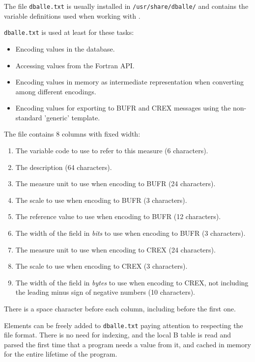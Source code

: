 The file {\tt dballe.txt} is usually installed in {\tt /usr/share/dballe/} and
contains the variable definitions used when working with \dballe{}.

{\tt dballe.txt} is used at least for these tasks:

\begin{itemize}
\item Encoding values in the \dballe{} database.
\item Accessing values from the Fortran API\cite{FAPI}.
\item Encoding values in memory as intermediate representation when converting
      among different encodings.
\item Encoding values for exporting to BUFR and CREX messages using the
      non-standard 'generic' template.
\end{itemize}

The file contains 8 columns with fixed width:

\begin{enumerate}
\item The variable code to use to refer to this measure (6 characters).
\item The description (64 characters).
\item The measure unit to use when encoding to BUFR (24 characters).
\item The scale to use when encoding to BUFR (3 characters).
\item The reference value to use when encoding to BUFR (12 characters).
\item The width of the field in \emph{bits} to use when encoding to BUFR (3 characters).
\item The measure unit to use when encoding to CREX (24 characters).
\item The scale to use when encoding to CREX (3 characters).
\item The width of the field in \emph{bytes} to use when encoding to CREX, not
      including the leading minus sign of negative numbers (10 characters).
\end{enumerate}

There is a space character before each column, including before the first one.

Elements can be freely added to {\tt dballe.txt} paying attention to respecting
the file format.  There is no need for indexing, and the local B table is read
and parsed the first time that a program needs a value from it, and cached in
memory for the entire lifetime of the program.

